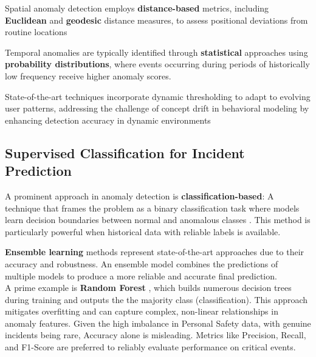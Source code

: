 \documentclass[12pt,a4paper,oneside,english]{book}
\begin{document}
{Spatial anomaly detection employs \textbf{distance-based} metrics, including \textbf{Euclidean} and \textbf{geodesic} distance measures, to assess positional deviations from routine locations %

Temporal anomalies are typically identified through \textbf{statistical} approaches using \textbf{probability distributions}, where events occurring during periods of historically low frequency receive higher anomaly scores.

State-of-the-art techniques incorporate dynamic thresholding to adapt to evolving user patterns, addressing the challenge of concept drift in behavioral modeling  by enhancing detection accuracy in dynamic environments%

\subsection{Supervised Classification for Incident Prediction}
\label{sec:supervised_classification}

A prominent approach in anomaly detection is \textbf{classification-based}: A technique that frames the problem as a binary classification task where models learn decision boundaries between normal and anomalous classes \cite{chandola2009anomaly}. This method is particularly powerful when historical data with reliable labels is available.

\textbf{Ensemble learning} methods represent state-of-the-art approaches due to their accuracy and robustness. An ensemble model combines the predictions of multiple models to produce a more reliable and accurate final prediction.
\\A prime example is \textbf{Random Forest} \cite{Breiman2001RF}, which builds numerous decision trees during training and outputs the the majority class (classification). This approach mitigates overfitting and can capture complex, non-linear relationships in anomaly features.
Given the high imbalance in Personal Safety data, with genuine incidents being rare, Accuracy alone is misleading. Metrics like Precision, Recall, and F1-Score are preferred to reliably evaluate performance on critical events.


}
\end{document}
